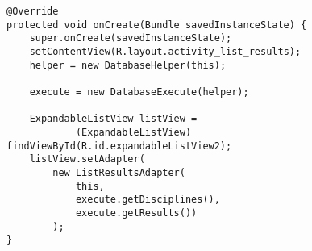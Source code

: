\begin{lstlisting}[style=custom_JAVA]
@Override
protected void onCreate(Bundle savedInstanceState) {
    super.onCreate(savedInstanceState);
    setContentView(R.layout.activity_list_results);
    helper = new DatabaseHelper(this);

    execute = new DatabaseExecute(helper);

    ExpandableListView listView = 
    		(ExpandableListView) findViewById(R.id.expandableListView2);
    listView.setAdapter(
    	new ListResultsAdapter(
        	this, 
        	execute.getDisciplines(),
        	execute.getResults())
    	); 
}
\end{lstlisting}